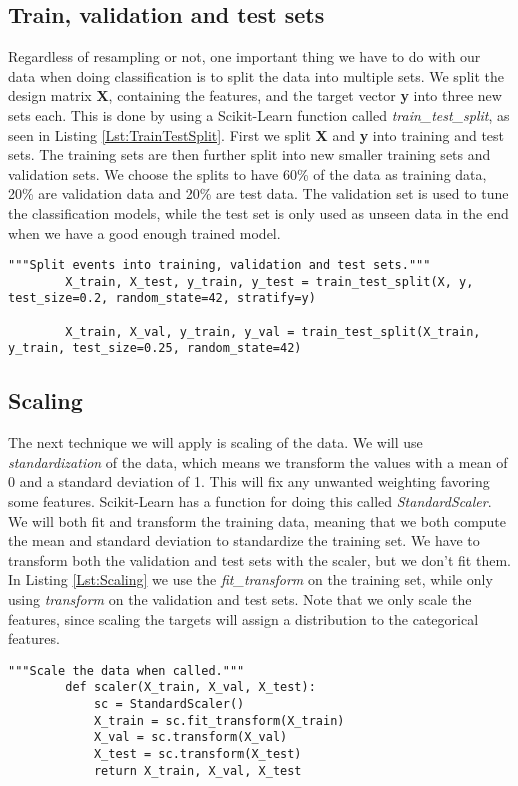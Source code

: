 \documentclass[a4paper, american, 12pt]{report}
\begin{document}
	\subsection{Train, validation and test sets}
	\label{subsect:Method-TrainTestSplit}
	Regardless of resampling or not, one important thing we have to do with our data when doing classification is to split the data into multiple sets. We split the design matrix \textbf{X}, containing the features, and the target vector \textbf{y} into three new sets each. This is done by using a Scikit-Learn function called \textit{train\_test\_split}, as seen in Listing \ref{Lst:TrainTestSplit}. First we split \textbf{X} and \textbf{y} into training and test sets. The training sets are then further split into new smaller training sets and validation sets. We choose the splits to have 60\% of the data as training data, 20\% are validation data and 20\% are test data. The validation set is used to tune the classification models, while the test set is only used as unseen data in the end when we have a good enough trained model.
	\begin{lstlisting}[caption=Splitting the data., label=Lst:TrainTestSplit]
		"""Split events into training, validation and test sets."""
		X_train, X_test, y_train, y_test = train_test_split(X, y, test_size=0.2, random_state=42, stratify=y)
		
		X_train, X_val, y_train, y_val = train_test_split(X_train, y_train, test_size=0.25, random_state=42)
	\end{lstlisting}


	\subsection{Scaling}
	\label{subsect:Method-Scaling}
	The next technique we will apply is scaling of the data. We will use \textit{standardization} of the data, which means we transform the values with a mean of 0 and a standard deviation of 1. This will fix any unwanted weighting favoring some features. Scikit-Learn has a function for doing this called \textit{StandardScaler}. We will both fit and transform the training data, meaning that we both compute the mean and standard deviation to standardize the training set. We have to transform both the validation and test sets with the scaler, but we don't fit them. In Listing \ref{Lst:Scaling} we use the \textit{fit\_transform} on the training set, while only using \textit{transform} on the validation and test sets. Note that we only scale the features, since scaling the targets will assign a distribution to the categorical features.
	\begin{lstlisting}[caption=Function for scaling data., label=Lst:Scaling]
		"""Scale the data when called."""
		def scaler(X_train, X_val, X_test):
			sc = StandardScaler()
			X_train = sc.fit_transform(X_train)
			X_val = sc.transform(X_val)
			X_test = sc.transform(X_test)
			return X_train, X_val, X_test
	\end{lstlisting}
	
\end{document}
